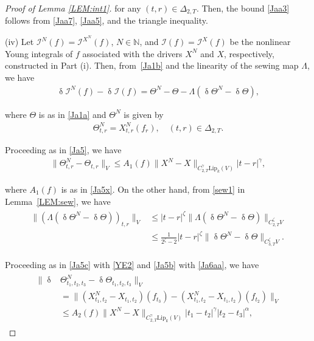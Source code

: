 \documentclass[letterpaper, 11pt,  reqno]{amsart}
\newcommand{\1}{\hspace{0.5mm}\text{I}\hspace{0.5mm}}
\newcommand{\I}{\mathcal{I}}
\newcommand{\noi}{\noindent}
\newcommand{\al}{\alpha}
\newcommand{\updl}{\updelta}
\newcommand{\Dl}{\Delta}
\newcommand{\g}{\gamma}
\newcommand{\Ld}{\Lambda}
\newcommand{\N}{\mathbb{N}}
\newcommand{\Lip}{\mathrm{Lip}}
\newcommand{\z}{\zeta}
\newcommand{\Ta}{\Theta}
\numberwithin{equation}{section}
\numberwithin{theorem}{section}
\begin{document}
\begin{proof}[Proof of Lemma \ref{LEM:int1}]
\noi
for any  $(t,r)\in \Dl_{2,T}$.
Then,
the bound \eqref{Jaa3} follows  from \eqref{Jaa7}, \eqref{Jaa5}, 
and the triangle inequality.


\medskip

\noi
(iv)
Let $\I^N(f) = \I^{X^N}(f)$, $N \in \N$, and $\I(f) = \I^X(f)$
be the nonlinear Young integrals of $f$ 
associated with the drivers
$X^N$ and $X$, respectively, 
constructed in Part (i).
Then, 
from~\eqref{Ja1b} and the linearity of the sewing map $\Ld$, we have 
\begin{align}
\updl \I^N(f) - \updl \I(f)  = \Ta^N - \Ta - \Ld  (\updl \Ta^N - \updl \Ta), 
\label{YE1}
\end{align}


\noi
where $\Ta$ is as in \eqref{Ja1a} and $\Ta^N$ is  given by 
\begin{align}
\Theta_{t,r}^N = X^N_{t,r}(f_r), 
  \quad (t,r)\in \Dl_{2,T}.
\label{YE2}
\end{align}


Proceeding as in \eqref{Ja5}, 
we have
\begin{align}
\| \Ta_{t, r}^N - \Ta_{t, r}\|_{V} 
\le A_1(f) \|X^N - X\|_{C^\g_{2,T}\Lip_k(V)}|t - r |^\g, 
\label{YE3}
\end{align}

\noi
where $A_1(f)$ is as in \eqref{Ja5x}.
On the other hand, 
 from \eqref{sew1} in  Lemma~\ref{LEM:sew}, we have 
\begin{align}
\begin{split}
\|(\Lambda (\updl \Theta^N - \updl \Ta))_{t,r}\|_{V}
& \le 
|t-r|^{\z}
\|\Lambda (\updl \Theta^N - \updl \Ta)\|_{C^\z_{2,T} V}\\
& \le
\frac{1}{2^\z - 2}
|t-r|^{\z}
\| \updl \Theta^N - \updl \Ta\|_{C^\z_{3,T} V}.
\end{split}
\label{YE4}
\end{align}


\noi
Proceeding as in \eqref{Ja5c}
with  \eqref{YE2}
and \eqref{Ja5b} with \eqref{Ja6aa}, 
we have 
\begin{align}
\label{YE5}
\begin{aligned}
 \|  \updl & \Theta^N_{t_1, t_2, t_3} - \updl \Ta_{t_1,t_2,t_3}\|_{V}\\
& = \big\|
(X^N_{t_1,t_2} - X_{t_1,t_2}) (f_{t_3}) - (X^N_{t_1,t_2}- X_{t_1,t_2})(f_{t_2})
\big\|_{V}\\
 & \le A_2(f)
 \|X^N - X\|_{C^\g_{2,T}\Lip_k(V)}|t_1 - t_2|^\g 
 |t_2- t_3|^\al, 
\end{aligned}
\end{align}


\end{proof}
\end{document}
